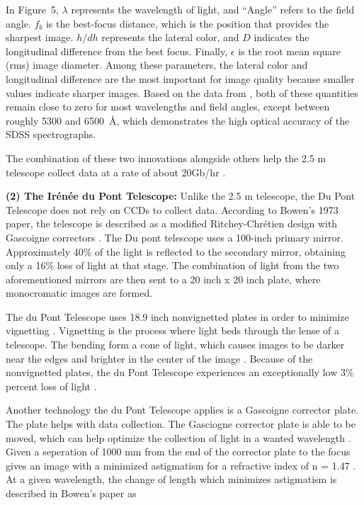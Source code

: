 \documentclass[preprint,linenumbers, longauthor]{aastex631}
\begin{document}
In Figure~5, $\lambda$ represents the wavelength of light, and “Angle” refers to the field angle. 
$f_b$ is the best-focus distance, which is the position that provides the sharpest image. 
$h/dh$ represents the lateral color, and $D$ indicates the longitudinal difference from the best focus. 
Finally, $\epsilon$ is the root mean square (rms) image diameter. 
Among these parameters, the lateral color and longitudinal difference are the most important for image quality because smaller values indicate sharper images. 
Based on the data from \cite{gunn25TelescopeSloan2006}, both of these quantities remain close to zero for most wavelengths and field angles, except between roughly 5300 and 6500~\AA, which demonstrates the high optical accuracy of the SDSS spectrographs.

The combination of these two innovations alongside others help the 2.5 m telescope collect data at a rate of about 20Gb/hr \cite{luptonSDSSImagingPipelines2007}.

\textbf{(2) The Irénée du Pont Telescope:}  
Unlike the 2.5 m telescope, the Du Pont Telescope does not rely on CCDs to collect data. According to Bowen's 1973 paper, the telescope is described as a modified Ritchey-Chrétien design with Gascoigne correctors \cite{bowenOpticalDesign40in1973}.
The Du pont telescope uses a 100-inch primary mirror. Approximately 40\% of the light is reflected to the secondary mirror, obtaining only a 16\% loss of light at that stage. \cite{bowenOpticalDesign40in1973}
The combination of light from the two aforementioned mirrors are then sent to a 20 inch x 20 inch plate, where monocromatic images are formed.

The du Pont Telescope uses 18.9 inch nonvignetted plates in order to minimize vignetting \cite{bowenOpticalDesign40in1973}. Vignetting is the process where light beds through the lense of a telescope. The bending form a cone of light, which causes images to be darker near the edges and brighter in the center of the image \cite{richardsWhatVignetting2020}.
Because of the nonvignetted plates, the du Pont Telescope experiences an exceptionally low 3\% percent loss of light \cite{bowenOpticalDesign40in1973}.

Another technology the du Pont Telescope applies is a Gascoigne corrector plate. The plate helps with data collection. The Gasciogne corrector plate is able to be moved, which can help optimize the collection of light in a wanted wavelength \cite{bowenOpticalDesign40in1973}.
Given a seperation of 1000 mm from the end of the corrector plate to the focus gives an image with a minimized astigmatism for a refractive index of n = 1.47 \cite{bowenOpticalDesign40in1973}.
At a given wavelength, the change of length which minimizes astigmatism is described in Bowen's paper as
\end{document}
